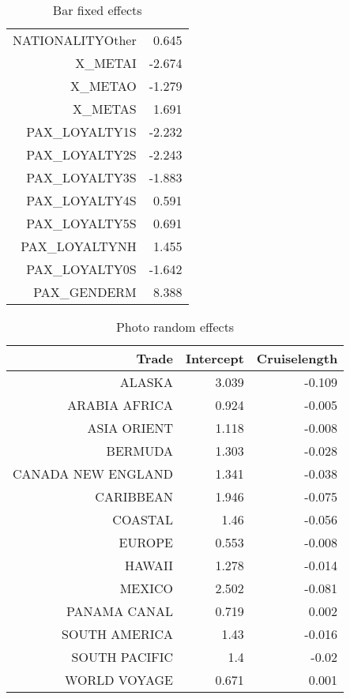 \documentclass{article}
\begin{document}
\begin{table}[H]
\begin{tabular}{rr}
		NATIONALITYOther	  &       0.645             \\                          
		X\_METAI	                  &          -2.674         \\                              
		X\_METAO	                  &    -1.279               \\                        
		X\_METAS	                  &          1.691          \\                             
		PAX\_LOYALTY1S    	  &       -2.232            \\                           
		PAX\_LOYALTY2S    	  &       -2.243            \\                           
		PAX\_LOYALTY3S    	  &       -1.883            \\                           
		PAX\_LOYALTY4S    	  &       0.591             \\                          
		PAX\_LOYALTY5S    	  &       0.691             \\                          
		PAX\_LOYALTYNH    	  &       1.455             \\                          
		PAX\_LOYALTY0S	          &       -1.642            \\                           
		PAX\_GENDERM	          &        8.388            \\  
		\hline 
		\hline 
	\end{tabular}
	\caption{Bar fixed effects} 
\end{table}

\begin{table}[H]
	\centering 
	\begin{tabular}{rrr}
		Trade & Intercept & Cruiselength \\
		\hline 
		\hline 
		ALASKA & 3.039 & -0.109 \\
		ARABIA AFRICA & 0.924 & -0.005 \\
		ASIA ORIENT & 1.118 & -0.008 \\
		BERMUDA & 1.303 & -0.028 \\
		CANADA NEW ENGLAND & 1.341 & -0.038 \\
		CARIBBEAN & 1.946 & -0.075 \\
		COASTAL & 1.46 & -0.056 \\
		EUROPE & 0.553 & -0.008 \\
		HAWAII & 1.278 & -0.014 \\
		MEXICO & 2.502 & -0.081 \\
		PANAMA CANAL & 0.719 & 0.002 \\
		SOUTH AMERICA & 1.43 & -0.016 \\
		SOUTH PACIFIC & 1.4 & -0.02 \\
		WORLD VOYAGE & 0.671 & 0.001 \\
		\hline 
		\hline 
	\end{tabular}
	\caption{Photo random effects}
\end{table}
\end{document}
